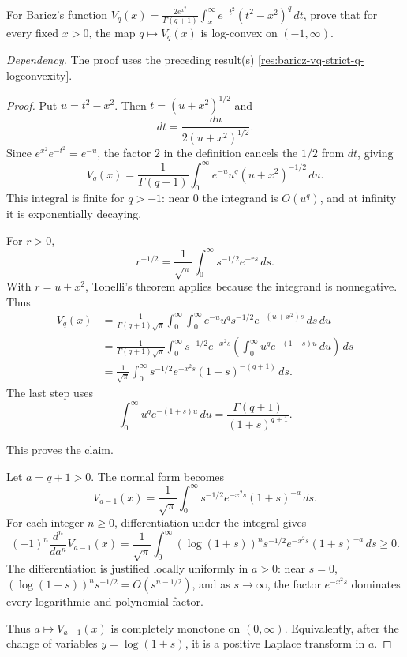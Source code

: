 \begin{proposition}
\label{res:baricz-vq-q-logconvexity-open-problem}
For Baricz's function \(V_q(x)=\frac{2e^{x^2}}{\Gamma(q+1)}\int_x^\infty e^{-t^2}(t^2-x^2)^q\,dt\), prove that for every fixed \(x>0\), the map \(q\mapsto V_q(x)\) is log-convex on \((-1,\infty)\).

\emph{Dependency.} The proof uses the preceding result(s) \ref{res:baricz-vq-strict-q-logconvexity}.
\end{proposition}
\begin{proof}
Put \(u=t^2-x^2\). Then \(t=(u+x^2)^{1/2}\) and
\[
dt=\frac{du}{2(u+x^2)^{1/2}}.
\]
Since \(e^{x^2}e^{-t^2}=e^{-u}\), the factor \(2\) in the definition cancels the \(1/2\) from \(dt\), giving
\[
V_q(x)=\frac1{\Gamma(q+1)}
\int_0^\infty e^{-u}u^q(u+x^2)^{-1/2}\,du.
\]
This integral is finite for \(q>-1\): near \(0\) the integrand is \(O(u^q)\), and at infinity it is exponentially decaying.

For \(r>0\),
\[
r^{-1/2}=\frac1{\sqrt\pi}\int_0^\infty s^{-1/2}e^{-rs}\,ds.
\]
With \(r=u+x^2\), Tonelli's theorem applies because the integrand is nonnegative. Thus
\[
\begin{aligned}
V_q(x)
&=\frac1{\Gamma(q+1)\sqrt\pi}
\int_0^\infty\int_0^\infty
e^{-u}u^q s^{-1/2}e^{-(u+x^2)s}\,ds\,du\\
&=\frac1{\Gamma(q+1)\sqrt\pi}
\int_0^\infty s^{-1/2}e^{-x^2s}
\left(\int_0^\infty u^q e^{-(1+s)u}\,du\right)\,ds\\
&=\frac1{\sqrt\pi}\int_0^\infty
s^{-1/2}e^{-x^2s}(1+s)^{-(q+1)}\,ds.
\end{aligned}
\]
The last step uses
\[
\int_0^\infty u^q e^{-(1+s)u}\,du
=\frac{\Gamma(q+1)}{(1+s)^{q+1}}.
\]

This proves the claim.

Let \(a=q+1>0\). The normal form becomes
\[
V_{a-1}(x)=\frac1{\sqrt\pi}\int_0^\infty
s^{-1/2}e^{-x^2s}(1+s)^{-a}\,ds.
\]
For each integer \(n\ge0\), differentiation under the integral gives
\[
(-1)^n\frac{d^n}{da^n}V_{a-1}(x)
=\frac1{\sqrt\pi}\int_0^\infty
(\log(1+s))^n s^{-1/2}e^{-x^2s}(1+s)^{-a}\,ds\ge0.
\]
The differentiation is justified locally uniformly in \(a>0\): near \(s=0\), \((\log(1+s))^n s^{-1/2}=O(s^{n-1/2})\), and as \(s\to\infty\), the factor \(e^{-x^2s}\) dominates every logarithmic and polynomial factor.

Thus \(a\mapsto V_{a-1}(x)\) is completely monotone on \((0,\infty)\). Equivalently, after the change of variables \(y=\log(1+s)\), it is a positive Laplace transform in \(a\).


\end{proof}
